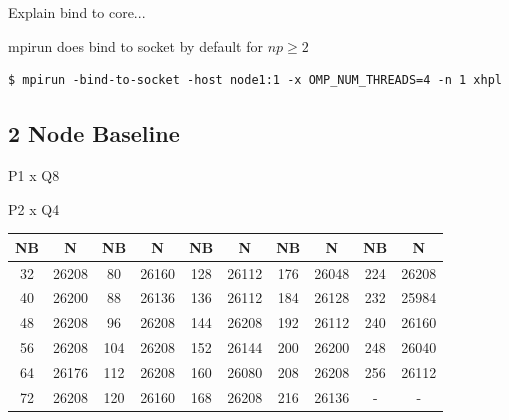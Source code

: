 \documentclass{report}
\begin{document}
Explain bind to core...

mpirun does bind to socket by default for $np \geq 2$


\lstset{style=type}
\begin{lstlisting}[]
$ mpirun -bind-to-socket -host node1:1 -x OMP_NUM_THREADS=4 -n 1 xhpl
\end{lstlisting}







\subsection{2 Node Baseline}

P1 x Q8

P2 x Q4

\begin{center}
	\begin{tabular}{ |c|c|c|c|c|c|c|c|c|c| } 
		\hline
		NB & N & NB & N & NB & N & NB & N & NB & N \\ 
		\hline
		32 & 26208 &   80 & 26160 & 128 & 26112 & 176 & 26048 & 224 & 26208 \\ 
		40 & 26200 &   88 & 26136 & 136 & 26112 & 184 & 26128 & 232 & 25984 \\ 
 		48 & 26208 &   96 & 26208 & 144 & 26208 & 192 & 26112 & 240 & 26160 \\
		56 & 26208 & 104 & 26208 & 152 & 26144 & 200 & 26200 & 248 & 26040 \\ 
 		64 & 26176 & 112 & 26208 & 160 & 26080 & 208 & 26208 & 256 & 26112 \\
		72 & 26208 & 120 & 26160 & 168 & 26208 & 216 & 26136 &     - &         - \\ 
 		\hline
	\end{tabular}
\end{center}
\end{document}
